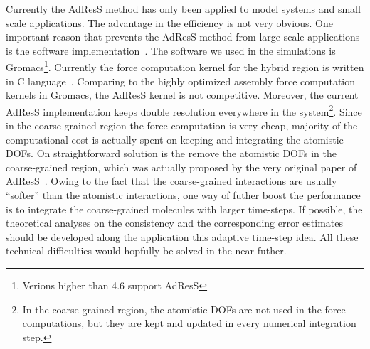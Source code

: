 \documentclass[epjST]{svjour}
\begin{document}

Currently the AdResS method has only been applied to model systems and small scale
applications. The advantage in the efficiency is not very obvious.
One important reason that prevents the AdResS method from
large scale applications is the software implementation~\cite{agarwal2014chemical}.
The software we used in the simulations is Gromacs\footnote{Verions higher than 4.6 support
AdResS}.
Currently the force computation kernel for the hybrid region is written in C language~\cite{kernighan1988c}.
Comparing to the highly optimized assembly force computation kernels in Gromacs,
the AdResS kernel is not competitive. Moreover, the current AdResS implementation
keeps double resolution everywhere in the system\footnote{In the coarse-grained region,
  the atomistic DOFs are not used in the force computations, but they are kept and updated
  in every numerical integration step.
}.
Since in the coarse-grained region the force computation is very cheap, majority
of the computational cost is actually spent on keeping and integrating the atomistic DOFs.
On straightforward solution is the remove the atomistic DOFs in the coarse-grained
region, which was actually proposed by the very original paper of AdResS~\cite{praprotnik2005adaptive}.
Owing to the fact that the coarse-grained interactions are usually ``softer''
than the atomistic interactions, one way of futher boost the performance is
to integrate the coarse-grained molecules with larger time-steps.
If possible, the theoretical analyses on the
consistency and the corresponding
error estimates should be developed along the application this adaptive time-step idea.
All these technical difficulties would hopfully be solved in the near futher.




{}


\end{document}
